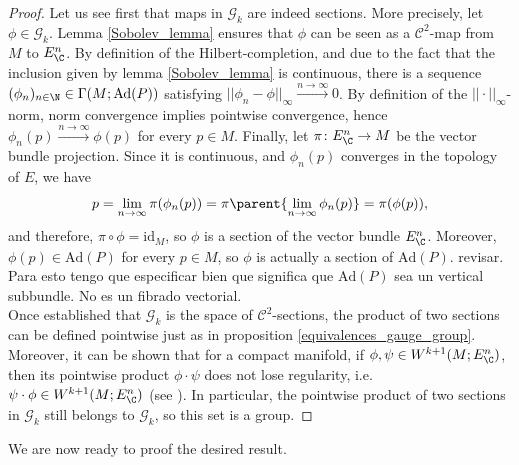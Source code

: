 \begin{proof}
    Let us see first that maps in \(\mathscr{G}_k\) are indeed sections. More precisely, let \(\phi \in \mathscr{G}_k\). Lemma \ref{Sobolev_lemma} ensures that 
    \(\phi\) can be seen as a \(\mathscr{C}^2\)-map from \(M\) to \(E_\C^n\). By definition of the Hilbert-completion, and due to the fact that the inclusion given by lemma \ref{Sobolev_lemma} is continuous, there is a sequence \((\phi_n)_{n \in \N} \in \Gamma(M;\mathrm{Ad}(P))\) satisfying \(||\phi_n-\phi||_\infty \xrightarrow{n \to \infty}0\). By definition of the \(||\cdot ||_\infty\)-norm, norm convergence implies pointwise convergence, hence \(\phi_n(p) \xrightarrow{n \to \infty} \phi(p)\) for every \(p \in M\). Finally, let \(\pi\colon E_\C^n \to M\) be the vector bundle projection. Since it is continuous, and \(\phi_n(p)\) converges in the topology of \(E\), we have
    \[
    p=\lim_{n \to \infty} \pi(\phi_n(p))=\pi\parent{\lim_{n \to \infty} \phi_n(p)}=\pi(\phi(p)),
    \]
    and therefore, \(\pi \circ \phi = \mathrm{id}_M\), so \(\phi\) is a section of the vector bundle \(E_\C^n\). Moreover, \(\phi(p) \in \mathrm{Ad}(P)\) for every \(p \in M\), so \(\phi\) is actually a section of \(\mathrm{Ad}(P)\). {\color{red} revisar. Para esto tengo que especificar bien que significa que \(\mathrm{Ad}(P)\) sea un vertical subbundle. No es un fibrado vectorial.} \\

    Once established that \(\mathscr{G}_k\) is the space of \(\mathscr{C}^2\)-sections, the product of two sections can be defined pointwise just as in proposition \ref{equivalences_gauge_group}. Moreover, it can be shown that for a compact manifold, if \(\phi, \psi \in W^{k+1}(M;E_\C^n)\), then its pointwise product \(\phi \cdot \psi\) does not lose regularity, i.e. \(\psi \cdot \phi \in W^{k+1}(M;E_\C^n)\) (see \parencite[Lemma B.3]{wehrheim2004uhlenbeck}). In particular, the pointwise product of two sections in \(\mathscr{G}_k\) still belongs to \(\mathscr{G}_k\), so this set is a group.  
\end{proof}

We are now ready to proof the desired result.

